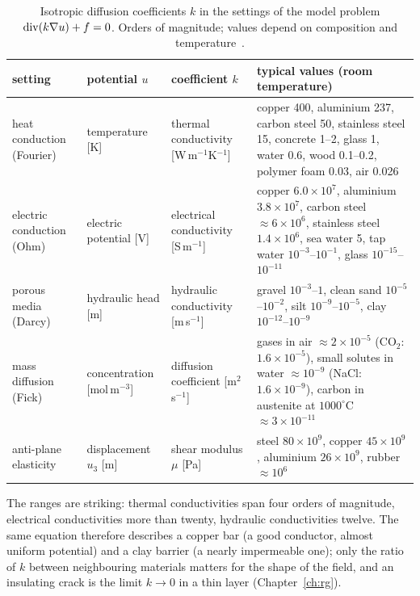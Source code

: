 \begin{table}[h]
\centering\small
\renewcommand{\arraystretch}{1.18}
\begin{tabular}{>{\raggedright}p{2.5cm}>{\raggedright}p{2.6cm}>{\raggedright}p{3.0cm}>{\raggedright\arraybackslash}p{6.2cm}}
\toprule
\sffamily setting & \sffamily potential $u$ & \sffamily coefficient $k$ & \sffamily typical values (room temperature)\\
\midrule
heat conduction (Fourier) & temperature [K] & thermal conductivity [W\,m$^{-1}$K$^{-1}$] &
copper 400, aluminium 237, carbon steel 50, stainless steel 15, concrete 1--2, glass 1, water 0.6, wood 0.1--0.2, polymer foam 0.03, air 0.026\\
electric conduction (Ohm) & electric potential [V] & electrical conductivity [S\,m$^{-1}$] &
copper $6.0\times10^{7}$, aluminium $3.8\times10^{7}$, carbon steel $\approx6\times10^{6}$, stainless steel $1.4\times10^{6}$, sea water 5, tap water $10^{-3}$--$10^{-1}$, glass $10^{-15}$--$10^{-11}$\\
porous media (Darcy) & hydraulic head [m] & hydraulic conductivity [m\,s$^{-1}$] &
gravel $10^{-3}$--$1$, clean sand $10^{-5}$--$10^{-2}$, silt $10^{-9}$--$10^{-5}$, clay $10^{-12}$--$10^{-9}$\\
mass diffusion (Fick) & concentration [mol\,m$^{-3}$] & diffusion coefficient [m$^2$\,s$^{-1}$] &
gases in air $\approx2\times10^{-5}$ (CO$_2$: $1.6\times10^{-5}$), small solutes in water $\approx10^{-9}$ (NaCl: $1.6\times10^{-9}$), carbon in austenite at $1000^\circ$C $\approx3\times10^{-11}$\\
anti-plane elasticity & displacement $u_3$ [m] & shear modulus $\mu$ [Pa] &
steel $80\times10^{9}$, copper $45\times10^{9}$, aluminium $26\times10^{9}$, rubber $\approx10^{6}$\\
\bottomrule
\end{tabular}
\caption{Isotropic diffusion coefficients $k$ in the settings of the model
problem $\operatorname{div}(k\nabla u)+f=0$. Orders of magnitude; values depend on
composition and temperature~\cite{IncroperaDeWitt,FreezeCherry,Crank1975}.}
\label{tab:diff-values}
\end{table}
The ranges are striking: thermal conductivities span four orders of
magnitude, electrical conductivities more than twenty, hydraulic
conductivities twelve. The same equation therefore describes a copper bar
(a good conductor, almost uniform potential) and a clay barrier (a nearly
impermeable one); only the ratio of $k$ between neighbouring materials
matters for the shape of the field, and an insulating crack is the limit
$k\to0$ in a thin layer (Chapter~\ref{ch:rg}).

